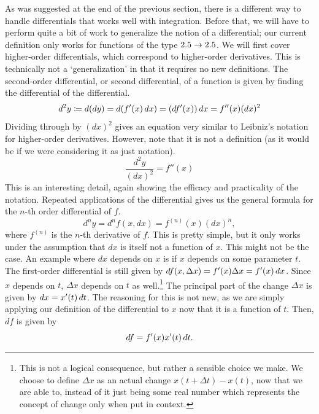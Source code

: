 \documentclass[a4paper,12pt]{article}
\begin{document}
As was suggested at the end of the previous section, there is a different way to handle differentials that works well with integration.
Before that, we will have to perform quite a bit of work to generalize the notion of a differential; our current definition only works for functions of the type $2.5 \to 2.5$.
We will first cover higher-order differentials, which correspond to higher-order derivatives.
This is technically not a `generalization' in that it requires no new definitions.
The second-order differential, or second differential, of a function is given by finding the differential of the differential.
\begin{equation*}
    d^2 y \coloneq d(dy) = d(f'(x)\mathop{}\!d x) = (df'(x)) \mathop{}\!d x = f''(x) (dx)^2
\end{equation*}
Dividing through by $(dx)^2$ gives an equation very similar to Leibniz's notation for higher-order derivatives.
However, note that it is not a definition (as it would be if we were considering it as just notation).
\begin{equation*}
    \frac{d^2 y}{(dx)^2} = f''(x)
\end{equation*}
This is an interesting detail, again showing the efficacy and practicality of the notation.
Repeated applications of the differential gives us the general formula for the $n$-th order differential of $f$.
\begin{equation*}
    d^n y = d^n f(x, dx) = f^{(n)}(x) (dx)^n,
\end{equation*}
where $f^{(n)}$ is the $n$-th derivative of $f$.
This is pretty simple, but it only works under the assumption that $dx$ is itself not a function of $x$.
This might not be the case.
An example where $dx$ depends on $x$ is if $x$ depends on some parameter $t$.
The first-order differential is still given by $df(x, \Delta x) = f'(x) \Delta x = f'(x)\mathop{}\!d x$.
Since $x$ depends on $t$, $\Delta x$ depends on $t$ as well.\footnote{This is not a logical consequence, but rather a sensible choice we make. We choose to define $\Delta x$ as an actual change $x(t+\Delta t) - x(t)$, now that we are able to, instead of it just being some real number which represents the concept of change only when put in context.}
The principal part of the change $\Delta x$ is given by $dx = x'(t) \mathop{}\!d t$.
The reasoning for this is not new, as we are simply applying our definition of the differential to $x$ now that it is a function of $t$.
Then, $df$ is given by
\begin{equation*}
    df = f'(x)x'(t) \mathop{}\!d t.
\end{equation*}
\end{document}
